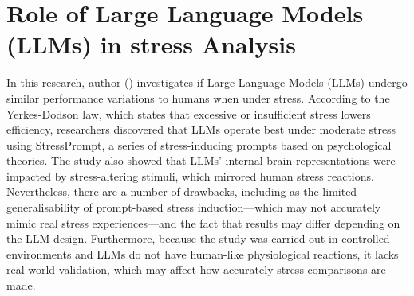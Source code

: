 \documentclass[Arial,12pt,openright,twoside]{book}
\begin{document}
  \section{Role of Large Language Models (LLMs) in stress Analysis}
  In this research, author (\citet{shen2024}) investigates if Large Language Models (LLMs) undergo similar performance variations to humans when under stress. According to the Yerkes-Dodson law, which states that excessive or insufficient stress lowers efficiency, researchers discovered that LLMs operate best under moderate stress using StressPrompt, a series of stress-inducing prompts based on psychological theories. The study also showed that LLMs' internal brain representations were impacted by stress-altering stimuli, which mirrored human stress reactions. Nevertheless, there are a number of drawbacks, including as the limited generalisability of prompt-based stress induction—which may not accurately mimic real stress experiences—and the fact that results may differ depending on the LLM design. Furthermore, because the study was carried out in controlled environments and LLMs do not have human-like physiological reactions, it lacks real-world validation, which may affect how accurately stress comparisons are made. 
\end{document}
